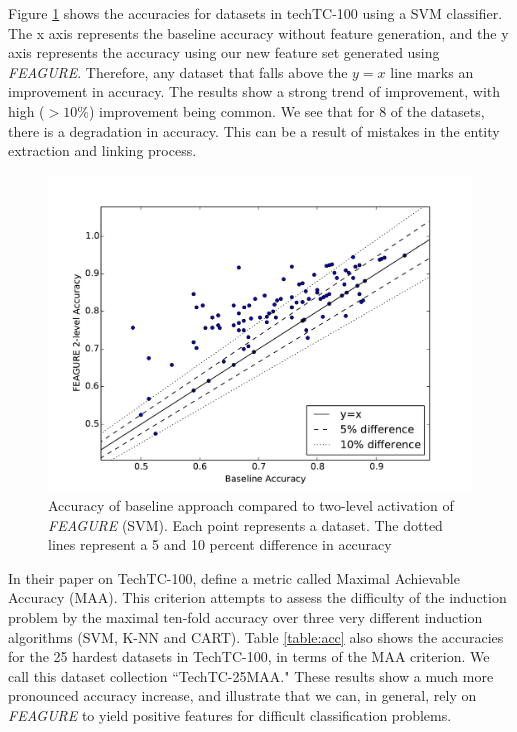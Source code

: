 \documentclass[letterpaper]{article} %
\theoremstyle{definition}
\begin{document}
Figure \ref{fig:svm_base_lvl2} shows the accuracies for datasets in techTC-100 using a SVM classifier. The x axis represents the baseline accuracy without feature generation, and the y axis represents the accuracy using our new feature set generated using \emph{FEAGURE}. Therefore, any dataset that falls above the $y=x$ line marks an improvement in accuracy. 
The results show a strong trend of improvement, with high ($>10\%$) improvement being common.
We see that for 8 of the datasets, there is a degradation in accuracy. This can be a result of mistakes in the entity extraction and linking process.

\begin{figure}
	\centering
	\includegraphics[width=1.0\linewidth]{svm_full_lvl2}
	\caption{Accuracy of
		baseline approach compared to two-level activation of \emph{FEAGURE} (SVM). Each point represents a dataset. The dotted lines represent a 5 and 10 percent difference in accuracy}
	\label{fig:svm_base_lvl2}
\end{figure}


In their paper on TechTC-100, \cite{gabrilovich2004text} define a metric called Maximal Achievable Accuracy (MAA). This criterion attempts to assess the difficulty of the induction problem by the maximal ten-fold accuracy over three very different induction algorithms (SVM, K-NN and CART).
Table \ref{table:acc} also shows the accuracies for the 25 hardest datasets in TechTC-100, in terms of the MAA criterion. We call this dataset collection ``TechTC-25MAA." 
These results show a much more pronounced accuracy increase, and illustrate that we can, in general, rely on \emph{FEAGURE} to yield positive features for difficult classification problems.
\end{document}
